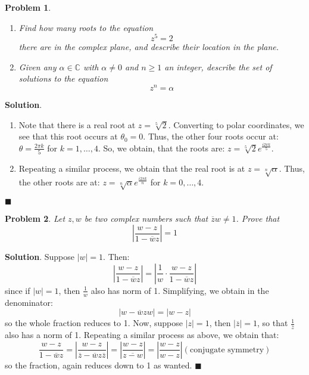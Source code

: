 \documentclass[12pt]{article}
\newcommand{\abs}[1]{\left| #1 \right|} %
\renewcommand{\=}[1]{\stackrel{#1}{=}} %
\newtheorem{p}{Problem}[section]
\theoremstyle{definition}
\newenvironment{s}{%
        \begin{trivlist} \item \textbf{Solution}. }{%
            \hspace*{\fill} $\blacksquare$\end{trivlist}}%
\begin{document}
\begin{p}
    \begin{enumerate}
        \item Find how many roots to the equation \[ z^5 = 2 \] there are in the complex
            plane, and describe their location in the plane.
        \item Given any $\alpha\in\mathbb{C}$ with $\alpha\neq0$ and $n\geq1$ an integer,
            describe the set of solutions to the equation \[ z^n = \alpha \]
    \end{enumerate}
\end{p}
\begin{s}
    \begin{enumerate}
        \item Note that there is a real root at $z = \sqrt[5]{2}$. Converting to polar
            coordinates, we see that this root occurs at $\theta_0 = 0$. Thus, the other
            four roots occur at: $\theta = \frac{2\pi k}{5}$ for $k = 1,\hdots,4$. So,
            we obtain, that the roots are: $z = \sqrt[5]{2}e^{\frac{i2\pi k}{5}}$.
        \item Repeating a similar process, we obtain that the real root is at 
            $z = \sqrt[n]{\alpha}$. Thus, the other roots are at: 
            $z = \sqrt[n]{\alpha}e^{\frac{i2\pi k}{n}}$ for $k = 0,\hdots,4$.
    \end{enumerate}
\end{s}

\begin{p}
    Let $z,w$ be two complex numbers such that $\overline{z}w\neq 1$. Prove that
    \[ \abs{\frac{w-z}{1-\overline{w}{z}}} = 1\]
\end{p}
\begin{s}
    Suppose $\abs{w} = 1$. Then:
    \[ \abs{\frac{w-z}{1-\overline{w}{z}}} = \abs{\frac{1}{w}\cdot\frac{w-z}{1-\overline{w}{z}}}\]
    since if $\abs{w} = 1$, then $\frac{1}{w}$ also has norm of 1. Simplifying, we obtain in the denominator:
    \[\abs{w - \overline{w}zw} = \abs{w - z} \]
    so the whole fraction reduces to 1. Now, suppose $\abs{z} = 1$, then $\abs{\overline{z}} = 1$, so that
    $\frac{1}{\overline{z}}$ also has a norm of 1. Repeating a similar process as above, we obtain that:
    \[ \frac{w-z}{1-\overline{w}z} = \abs{\frac{w-z}{\overline{z} - \overline{w}z\overline{z}}} = \abs{\frac{w-z}{\overline{z-w}}} = \abs{\frac{w-z}{w-z}} (\text{conjugate symmetry})\]
    so the fraction, again reduces down to 1 as wanted.
\end{s}
\end{document}
